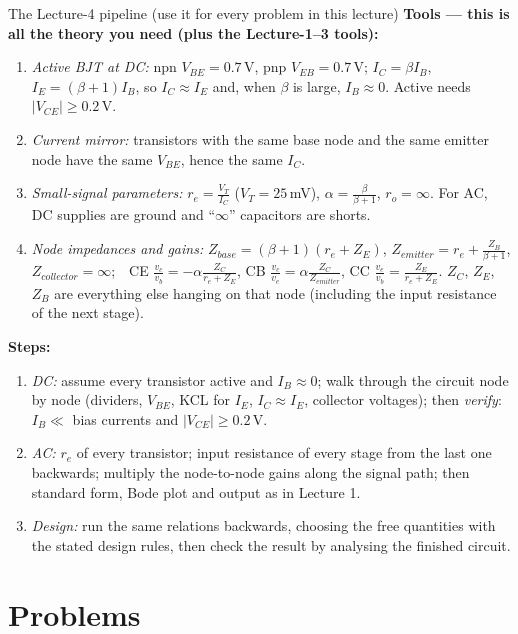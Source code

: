 \documentclass[11pt]{article}
\begin{document}
\begin{cardbox}{The Lecture-4 pipeline (use it for every problem in this lecture)}
\textbf{Tools --- this is all the theory you need (plus the Lecture-1--3 tools):}
\begin{enumerate}[label=\textbf{T\arabic*},leftmargin=2.2em,itemsep=1pt]
\item \emph{Active BJT at DC:} npn $V_{BE}=0.7$\,V, pnp $V_{EB}=0.7$\,V; $I_C=\beta I_B$, $I_E=(\beta+1)I_B$, so
      $I_C\approx I_E$ and, when $\beta$ is large, $I_B\approx 0$. Active needs $|V_{CE}|\ge 0.2$\,V.
\item \emph{Current mirror:} transistors with the same base node and the same emitter node have the same $V_{BE}$,
      hence the same $I_C$.
\item \emph{Small-signal parameters:} $r_e = \frac{V_T}{I_C}$ ($V_T=25$\,mV), $\alpha=\frac{\beta}{\beta+1}$, $r_o=\infty$.
      For AC, DC supplies are ground and ``$\infty$'' capacitors are shorts.
\item \emph{Node impedances and gains:} $Z_{base}=(\beta+1)(r_e+Z_E)$, $Z_{emitter}=r_e+\frac{Z_B}{\beta+1}$,
      $Z_{collector}=\infty$;\ \ CE $\frac{v_c}{v_b}=-\alpha\frac{Z_C}{r_e+Z_E}$, CB $\frac{v_c}{v_e}=\alpha\frac{Z_C}{Z_{emitter}}$,
      CC $\frac{v_e}{v_b}=\frac{Z_E}{r_e+Z_E}$. $Z_C$, $Z_E$, $Z_B$ are everything else hanging on that node
      (including the input resistance of the next stage).
\end{enumerate}
\textbf{Steps:}
\begin{enumerate}[leftmargin=2.2em,itemsep=1pt]
\item \emph{DC:} assume every transistor active and $I_B\approx0$; walk through the circuit node by node
      (dividers, $V_{BE}$, KCL for $I_E$, $I_C\approx I_E$, collector voltages); then \emph{verify}: $I_B\ll$ bias currents and
      $|V_{CE}|\ge0.2$\,V.
\item \emph{AC:} $r_e$ of every transistor; input resistance of every stage from the last one backwards; multiply the
      node-to-node gains along the signal path; then standard form, Bode plot and output as in Lecture 1.
\item \emph{Design:} run the same relations backwards, choosing the free quantities with the stated design rules, then
      check the result by analysing the finished circuit.
\end{enumerate}
\end{cardbox}

\section*{Problems}
\end{document}
